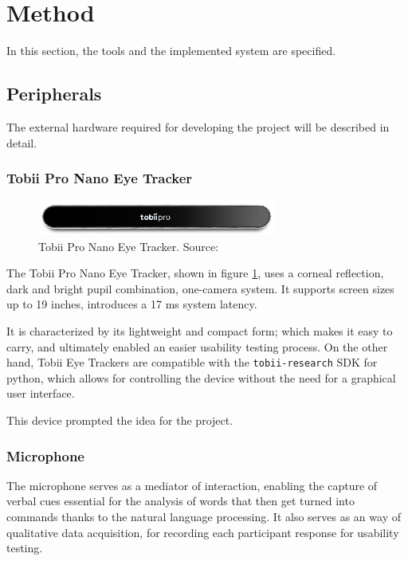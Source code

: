 \section{Method}
In this section, the tools and the implemented system are specified. 

\subsection{Peripherals}

The external hardware required for developing the project will be described in detail.

\subsubsection{Tobii Pro Nano Eye Tracker}

\begin{figure}[ht]
    \centering
    \includegraphics[width=0.7\textwidth]{images/tobii-pro-nano.png}
    \caption{Tobii Pro Nano Eye Tracker. Source: \citep{manual:tobiipronano}}
    \label{fig:tobii-eye-tracker}
\end{figure}

The Tobii Pro Nano Eye Tracker, shown in figure \ref{fig:tobii-eye-tracker}, uses a corneal reflection, dark and bright pupil combination, one-camera system. It supports screen sizes up to 19 inches, introduces a 17 ms system latency. \citep{manual:tobiipronano}

It is characterized by its lightweight and compact form; which makes it easy to carry, and ultimately enabled an easier usability testing process. On the other hand, Tobii Eye Trackers are compatible with the \verb|tobii-research| SDK for python, which allows for controlling the device without the need for a graphical user interface.

This device prompted the idea for the project.

\subsubsection{Microphone}

The microphone serves as a mediator of interaction, enabling the capture of verbal cues essential for the analysis of words that then get turned into commands thanks to the natural language processing. It also serves as an way of qualitative data acquisition, for recording each participant response for usability testing.

